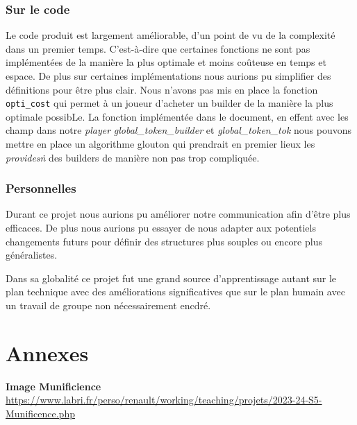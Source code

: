\documentclass{article}
\begin{document}
\subsubsection{Sur le code}
\hspace{1em} Le code produit est largement améliorable, d'un point de vu de la complexité dans un premier temps. C'est-à-dire que certaines fonctions ne sont pas implémentées de la manière la plus optimale et moins coûteuse en temps et espace. De plus sur certaines implémentations nous aurions pu simplifier des définitions pour être plus clair. 
Nous n'avons pas mis en place la fonction \texttt{opti\_cost} qui permet à un joueur d'acheter un builder de la manière la plus optimale possibLe. La fonction implémentée dans le document, en effent avec les champ dans notre \emph{player} \emph{global\_token\_builder} et \emph{global\_token\_tok} nous pouvons mettre en place un algorithme glouton qui prendrait en premier lieux les \emph{provides\.n} des builders de manière non pas trop compliquée. 

\subsubsection{Personnelles}
\hspace{1em} Durant ce projet nous aurions pu améliorer notre communication afin d'être plus efficaces. De plus nous aurions pu essayer de nous adapter aux potentiels changements futurs pour définir des structures plus souples ou encore plus généralistes. 

\vspace{1em}
\hspace{1em} Dans sa globalité ce projet fut une grand source d'apprentissage autant sur le plan technique avec des améliorations significatives que sur le plan humain avec un travail de groupe non nécessairement encdré. 

\section{Annexes}

\noindent [Labri.fr] \textbf{Image Munificience} 
\href{https://www.labri.fr/perso/renault/working/teaching/projets/2023-24-S5-Munificence.php}{https://www.labri.fr/perso/renault/working/teaching/projets/2023-24-S5-Munificence.php}
\end{document}
